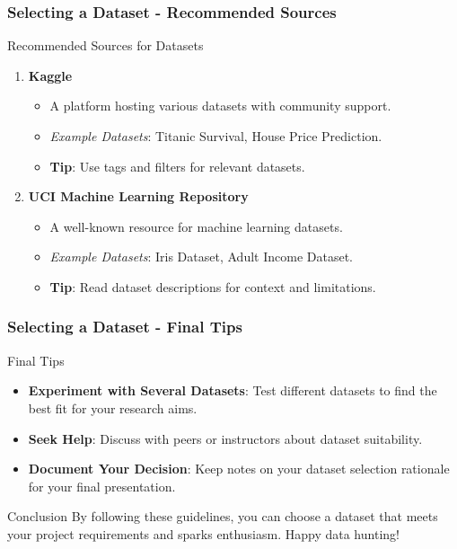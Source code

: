 \documentclass[aspectratio=169]{beamer}
\begin{document}
\begin{frame}[fragile]
    \frametitle{Selecting a Dataset - Recommended Sources}
    \begin{block}{Recommended Sources for Datasets}
        \begin{enumerate}
            \item \textbf{Kaggle}  
            \begin{itemize}
                \item A platform hosting various datasets with community support.
                \item \textit{Example Datasets}: Titanic Survival, House Price Prediction.
                \item \textbf{Tip}: Use tags and filters for relevant datasets.
            \end{itemize}
            
            \item \textbf{UCI Machine Learning Repository}  
            \begin{itemize}
                \item A well-known resource for machine learning datasets.
                \item \textit{Example Datasets}: Iris Dataset, Adult Income Dataset.
                \item \textbf{Tip}: Read dataset descriptions for context and limitations.
            \end{itemize}
        \end{enumerate}
    \end{block}
\end{frame}

\begin{frame}[fragile]
    \frametitle{Selecting a Dataset - Final Tips}
    \begin{block}{Final Tips}
        \begin{itemize}
            \item \textbf{Experiment with Several Datasets}: Test different datasets to find the best fit for your research aims.
            \item \textbf{Seek Help}: Discuss with peers or instructors about dataset suitability.
            \item \textbf{Document Your Decision}: Keep notes on your dataset selection rationale for your final presentation.
        \end{itemize}
    \end{block}
    
    \begin{block}{Conclusion}
        By following these guidelines, you can choose a dataset that meets your project requirements and sparks enthusiasm. Happy data hunting!
    \end{block}
\end{frame}
\end{document}
